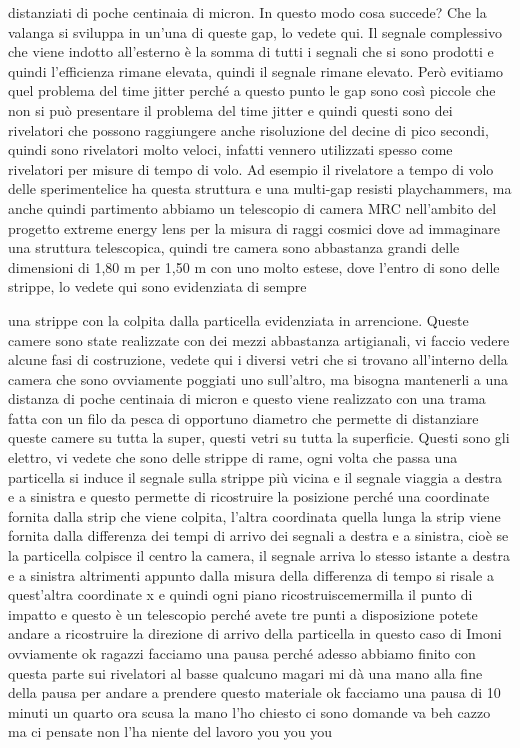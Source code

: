 distanziati di poche centinaia di micron. In questo modo cosa succede? Che la valanga si sviluppa in un'una di queste gap, lo vedete qui. Il segnale complessivo che viene indotto all'esterno è la somma di tutti i segnali che si sono prodotti e quindi l'efficienza rimane elevata, quindi il segnale rimane elevato. Però evitiamo quel problema del time jitter perché a questo punto le gap sono così piccole che non si può presentare il problema del time jitter e quindi questi sono dei rivelatori che possono raggiungere anche risoluzione del decine di pico secondi, quindi sono rivelatori molto veloci, infatti vennero utilizzati spesso come rivelatori per misure di tempo di volo. Ad esempio il rivelatore a tempo di volo delle sperimentelice ha questa struttura e una multi-gap resisti playchammers, ma anche quindi partimento abbiamo un telescopio di camera MRC nell'ambito del progetto extreme energy lens per la misura di raggi cosmici dove ad immaginare una struttura telescopica, quindi tre camera sono abbastanza grandi delle dimensioni di 1,80 m per 1,50 m con uno molto estese, dove l'entro di sono delle strippe, lo vedete qui sono evidenziata di sempre 


una strippe con la colpita dalla particella evidenziata in arrencione. Queste camere sono state realizzate con dei mezzi abbastanza artigianali, vi faccio vedere alcune fasi di costruzione, vedete qui i diversi vetri che si trovano all'interno della camera che sono ovviamente poggiati uno sull'altro, ma bisogna mantenerli a una distanza di poche centinaia di micron e questo viene realizzato con una trama fatta con un filo da pesca di opportuno diametro che permette di distanziare queste camere su tutta la super, questi vetri su tutta la superficie. Questi sono gli elettro, vi vedete che sono delle strippe di rame, ogni volta che passa una particella si induce il segnale sulla strippe più vicina e il segnale viaggia a destra e a sinistra e questo permette di ricostruire la posizione perché una coordinate fornita dalla strip che viene colpita, l'altra coordinata quella lunga la strip viene fornita dalla differenza dei tempi di arrivo dei segnali a destra e a sinistra, cioè se la particella colpisce il centro la camera, il segnale arriva lo stesso istante a destra e a sinistra altrimenti appunto dalla misura della differenza di tempo si risale a quest'altra coordinate x e quindi ogni piano ricostruiscemermilla il punto di impatto e questo è un telescopio perché avete tre punti a disposizione potete andare a ricostruire la direzione di arrivo della particella in questo caso di Imoni ovviamente ok ragazzi facciamo una pausa perché adesso abbiamo finito con questa parte sui rivelatori al basse qualcuno magari mi dà una mano alla fine della pausa per andare a prendere questo materiale ok facciamo una pausa di 10 minuti un quarto ora scusa la mano l'ho chiesto ci sono domande va beh cazzo ma ci pensate non l'ha niente del lavoro you you you



